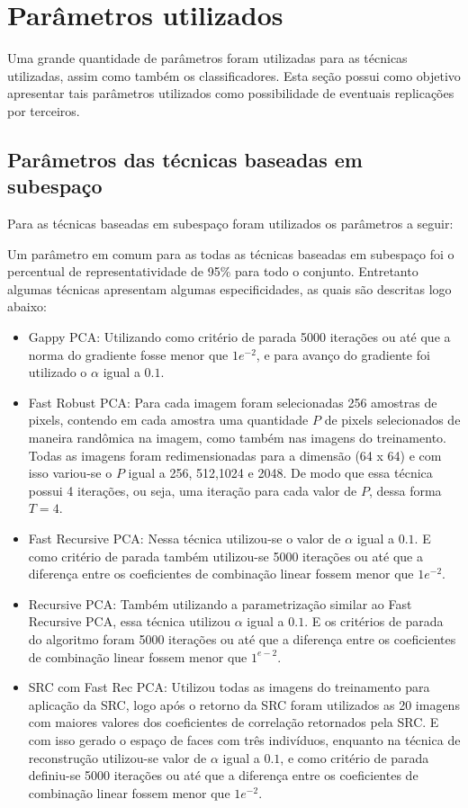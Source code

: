 \section{Parâmetros utilizados}

Uma grande quantidade de parâmetros foram utilizadas para as técnicas utilizadas, assim como também os classificadores. Esta seção possui como objetivo apresentar tais parâmetros utilizados como possibilidade de eventuais replicações por terceiros.

\subsection{Parâmetros das técnicas baseadas em subespaço}

Para as técnicas baseadas em subespaço foram utilizados os parâmetros a seguir:

Um parâmetro em comum para as todas as técnicas baseadas em subespaço foi o percentual de representatividade de 95\% para todo o conjunto. Entretanto algumas técnicas apresentam algumas especificidades, as quais são descritas logo abaixo:

\begin{itemize}
\item Gappy PCA: Utilizando como critério de parada 5000 iterações ou até que a norma do gradiente fosse menor que $1e^{-2}$, e para avanço do gradiente foi utilizado o $\alpha$ igual a $0.1$.
\item Fast Robust PCA: Para cada imagem foram selecionadas 256 amostras de pixels, contendo em cada amostra uma quantidade $P$ de pixels selecionados de maneira randômica na imagem, como também nas imagens do treinamento. Todas as imagens foram redimensionadas para a dimensão (64 x 64) e com isso variou-se o $P$ igual a 256, 512,1024 e 2048. De modo que essa técnica possui 4 iterações, ou seja, uma iteração para cada valor de $P$, dessa forma $T = 4$.
\item Fast Recursive PCA: Nessa técnica utilizou-se o valor de  $\alpha$ igual a $0.1$. E como critério de  parada também utilizou-se 5000 iterações ou  até que a diferença entre os coeficientes de combinação linear fossem menor que $1e^{-2}$.
\item Recursive PCA: Também utilizando a parametrização similar ao Fast Recursive PCA, essa técnica utilizou $\alpha$ igual a $0.1$. E os critérios de parada do algoritmo foram 5000 iterações ou até que a diferença entre os coeficientes de combinação linear fossem menor que $1^{e-2}$.
\item SRC com Fast Rec PCA: Utilizou todas as imagens do treinamento para aplicação da SRC, logo após o retorno da SRC foram utilizados as 20 imagens com maiores valores dos coeficientes de correlação retornados pela SRC. E com isso gerado o espaço de faces com três indivíduos, enquanto na técnica de reconstrução utilizou-se valor de $\alpha$ igual a $0.1$, e como critério de parada definiu-se 5000 iterações ou até que a diferença entre os coeficientes de combinação linear fossem menor que $1e^{-2}$.
\end{itemize}




